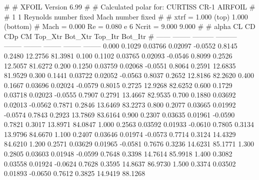 #  
#       XFOIL         Version 6.99
#  
# Calculated polar for: CURTISS CR-1 AIRFOIL                            
#  
# 1 1 Reynolds number fixed          Mach number fixed         
#  
# xtrf =   1.000 (top)        1.000 (bottom)  
# Mach =   0.000     Re =     0.080 e 6     Ncrit =   9.000  9.000
#  
#   alpha    CL        CD       CDp       CM     Top_Xtr  Bot_Xtr  Top_Itr  Bot_Itr
#  ------ -------- --------- --------- -------- -------- -------- -------- --------
   0.000   0.1029   0.03766   0.02097  -0.0552   0.8145   0.2480  12.2756  81.3981
   0.100   0.1102   0.03765   0.02093  -0.0546   0.8099   0.2526  12.5057  81.6272
   0.200   0.1250   0.03759   0.02068  -0.0551   0.8064   0.2591  12.6835  81.9529
   0.300   0.1441   0.03722   0.02052  -0.0563   0.8037   0.2652  12.8186  82.2620
   0.400   0.1667   0.03696   0.02024  -0.0579   0.8015   0.2725  12.9268  82.6252
   0.600   0.1729   0.03718   0.02023  -0.0555   0.7907   0.2791  13.4667  82.9535
   0.700   0.1880   0.03692   0.02013  -0.0562   0.7871   0.2846  13.6469  83.2273
   0.800   0.2077   0.03665   0.01992  -0.0574   0.7843   0.2923  13.7869  83.6164
   0.900   0.2307   0.03635   0.01961  -0.0590   0.7821   0.3017  13.8971  84.0847
   1.000   0.2563   0.03592   0.01933  -0.0610   0.7805   0.3134  13.9796  84.6670
   1.100   0.2407   0.03646   0.01974  -0.0573   0.7714   0.3124  14.4329  84.6210
   1.200   0.2571   0.03629   0.01965  -0.0581   0.7676   0.3236  14.6231  85.1771
   1.300   0.2805   0.03603   0.01948  -0.0599   0.7648   0.3398  14.7614  85.9918
   1.400   0.3082   0.03558   0.01924  -0.0624   0.7628   0.3595  14.8637  86.9730
   1.500   0.3374   0.03502   0.01893  -0.0650   0.7612   0.3825  14.9419  88.1268
